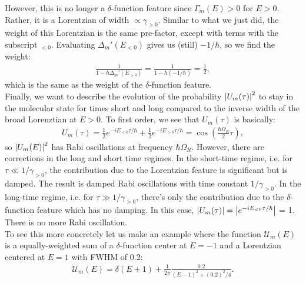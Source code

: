 \documentclass{article}
\theoremstyle{definition}
\newcommand{\f}[2]{\frac{#1}{#2}}
\newcommand{\lp}{\left(}
\newcommand{\rp}{\right)}
\begin{document}
\begin{enumerate}[label=(\alph*)]
However, this is no longer a $\delta$-function feature since $\Gamma_m(E) > 0$ for $E>0$. Rather, it is a Lorentzian of width $\propto \gamma_{>0}$. Similar to what we just did, the weight of this Lorentzian is the same pre-factor, except with terms with the subscript $_{<0}$.  Evaluating $\Delta_m'(E_{<0})$ gives us (still) $-1/\hbar$, so we find the weight:
\begin{align*}
\f{1}{1 - \hbar \Delta_m'(E_{>0})} = \f{1}{1 - \hbar (-1/\hbar)} = \f{1}{2},
\end{align*}
which is the same as the weight of the $\delta$-function feature. \\

Finally, we want to describe the evolution of the probability $\abs{U_m(\tau)}^2$ to stay in the molecular state for times short and long compared to the inverse width of the broad Lorenztian at $E>0$. To first order, we see that $U_m(\tau)$ is basically:
\begin{align*}
U_m(\tau) = \f{1}{2} e^{-i E_{<0} \tau / \hbar} + \f{1}{2} e^{-i E_{>0} \tau/\hbar} = \cos \lp \f{\hbar \Omega_R}{2} \tau \rp,
\end{align*}
so $\abs{U_m(E)}^2$ has Rabi oscillations at frequency $\hbar \Omega_R$. However, there are corrections in the long and short time regimes. In the short-time regime, i.e. for $\tau \ll 1 / \gamma_{>0}$, the contribution due to the Lorentzian feature is significant but is damped. The result is damped Rabi oscillations with time constant $1/\gamma_{>0}$. In the long-time regime, i.e. for $\tau \gg 1 / \gamma_{>0}$, there's only the contribution due to the $\delta$-function feature which has no damping. In this case, $\abs{U_m(\tau)} = \abs{e^{-i E_{<0} \tau / \hbar}}$ = 1. There is no more Rabi oscillation. \\

To see this more concretely let us make an example where the function $\mathcal{U}_m(E)$ is a equally-weighted sum of a $\delta$-function center at $E = -1$ and a Lorentzian centered at $E = 1$ with FWHM of $0.2$:
\begin{align*}
\mathcal{U}_m(E) = \delta(E+1) + \f{1}{2\pi} \f{0.2}{(E-1)^2 + (0.2)^2/4}.
\end{align*}


\end{enumerate}
\end{document}
